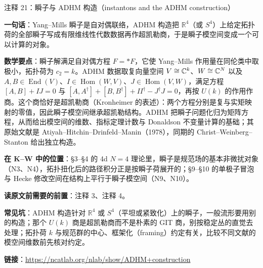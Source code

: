 \begin{kcard}{注释 21：瞬子与 ADHM 构造（instantons and the ADHM construction）}

\textbf{一句话}：Yang--Mills 瞬子是自对偶联络，ADHM 构造把 $\mathbb{R}^4$（或 $S^4$）上给定拓扑荷的全部瞬子写成有限维线性代数数据再作超凯勒商，于是瞬子模空间变成一个可以计算的对象。

\textbf{数学要点}：瞬子解满足自对偶方程 $F=*F$，它使 Yang--Mills 作用量在同伦类中取极小，拓扑荷为 $c_2=k$。ADHM 数据取复向量空间 $V\cong\mathbb{C}^k$、$W\cong\mathbb{C}^N$ 以及 $A,B\in\operatorname{End}(V)$、$I\in\operatorname{Hom}(W,V)$、$J\in\operatorname{Hom}(V,W)$，满足方程 $[A,B]+IJ=0$ 与 $[A,A^\dagger]+[B,B^\dagger]+II^\dagger-J^\dagger J=0$，再按 $U(k)$ 的作用作商。这个商恰好是超凯勒商（Kronheimer 的表述）：两个方程分别是复与实矩映射的零值，因此瞬子模空间继承超凯勒结构。ADHM 把瞬子问题化归为矩阵方程，从而给出模空间的维数、指标定理计数与 Donaldson 不变量计算的基础；其原始文献是 Atiyah--Hitchin--Drinfeld--Manin（1978），同期的 Christ--Weinberg--Stanton 给出独立构造。

\textbf{在 K--W 中的位置}：§3--§4 的 4d $N=4$ 理论里，瞬子是规范场的基本非微扰对象（N3、N4），拓扑扭化后的路径积分正是按瞬子荷展开的；§9--§10 的单极子冒泡与 Hecke 修改空间在结构上平行于瞬子模空间（N9、N10）。

\textbf{读原文前需要的前置}：注释 3、注释 4。

\textbf{常见坑}：ADHM 构造针对 $\mathbb{R}^4$ 或 $S^4$（平坦或紧致化）上的瞬子，一般流形要用别的构造；那个 $U(k)$ 商是超凯勒商而不是朴素的 GIT 商，别按稳定丛的直觉去处理；拓扑荷 $k$ 与规范群的中心、框架化（framing）约定有关，比较不同文献的模空间维数前先核对约定。

\noindent\textbf{链接}：\url{https://ncatlab.org/nlab/show/ADHM+construction}
\end{kcard}

